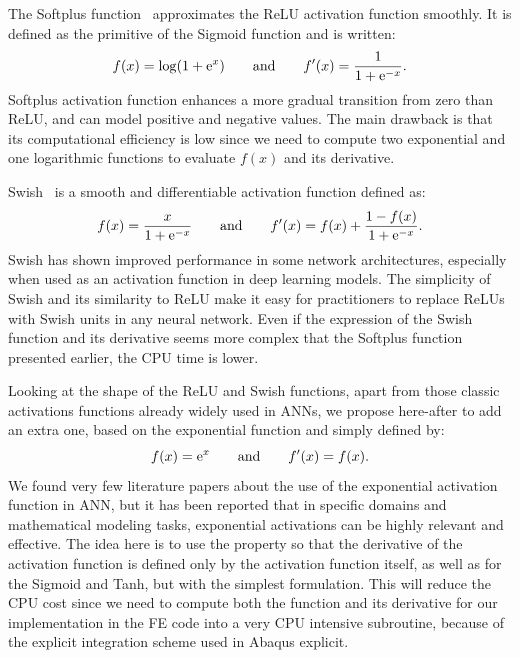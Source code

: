 \documentclass[algorithms,article,submit,pdftex,oneauthors]{Definitions/mdpi}
\DeclareRobustCommand{\e}[1]{{\rm e}^{#1}}
\begin{document}
The Softplus function~\cite{Dugas-2000-ISO} approximates the ReLU activation function smoothly.
It is defined as the primitive of the Sigmoid function and is written:
\begin{equation}
f(x) = \log\left(1+\e{x}\right)\qquad \text{and}\qquad f'(x) = \frac{1}{1+\e{-x}}.\label{eq:act-softplus}
\end{equation}
Softplus activation function enhances a more gradual transition from zero than ReLU, and can model positive and negative values.
The main drawback is that its computational efficiency is low since we need to compute two exponential and one logarithmic functions to evaluate $f(x)$ and its derivative.

Swish~\cite{Ramachandran-2018-SAF} is a smooth and differentiable activation function defined as:
\begin{equation}
f(x) = \frac{x}{1+\e{-x}}\qquad \text{and}\qquad f'(x) = f(x) + \frac{1 - f(x)}{1+\e{-x}}.\label{eq:act-swish}
\end{equation}
Swish has shown improved performance in some network architectures, especially when used as an activation function in deep learning models.
The simplicity of Swish and its similarity to ReLU make it easy for practitioners to replace ReLUs with Swish units in any neural network.
Even if the expression of the Swish function and its derivative seems more complex that the Softplus function presented earlier, the CPU time is lower.

Looking at the shape of the ReLU and Swish functions, apart from those classic activations functions already widely used in ANNs, we propose here-after to add an extra one, based on the exponential function and simply defined by:
\begin{equation}
f(x) = \e{x}\qquad \text{and}\qquad f'(x) = f(x).\label{eq:act-exp}
\end{equation}
We found very few literature papers about the use of the exponential activation function in ANN, but it has been reported that in specific domains and mathematical modeling tasks, exponential activations can be highly relevant and effective.
The idea here is to use the property so that the derivative of the activation function is defined only by the activation function itself, as well as for the Sigmoid and Tanh, but with the simplest formulation.
This will reduce the CPU cost since we need to compute both the function and its derivative for our implementation in the FE code into a very CPU intensive subroutine, because of the explicit integration scheme used in Abaqus explicit.
\end{document}
